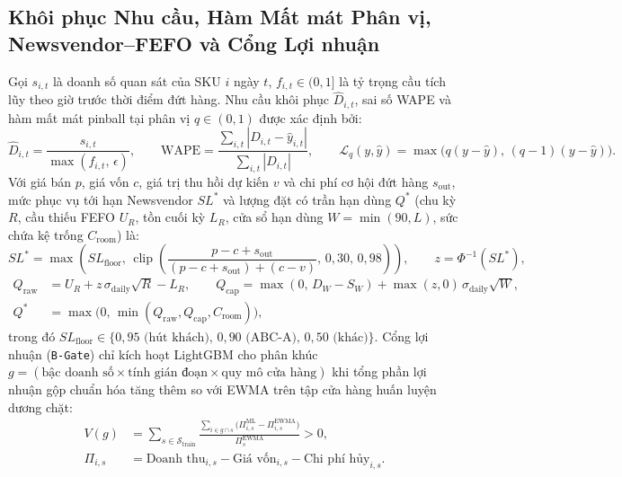 \subsection*{Khôi phục Nhu cầu, Hàm Mất mát Phân vị, Newsvendor--FEFO và Cổng Lợi nhuận}
Gọi $s_{i,t}$ là doanh số quan sát của SKU $i$ ngày $t$, $f_{i,t} \in (0,1]$ là tỷ trọng cầu tích lũy theo giờ trước thời điểm đứt hàng. Nhu cầu khôi phục $\hat{D}_{i,t}$, sai số WAPE và hàm mất mát pinball tại phân vị $q \in (0,1)$ được xác định bởi:
\begin{equation}
    \hat{D}_{i,t} = \frac{s_{i,t}}{\max(f_{i,t},\,\epsilon)}, \qquad
    \text{WAPE} = \frac{\sum_{i,t} \left|D_{i,t} - \hat{y}_{i,t}\right|}{\sum_{i,t} \left|D_{i,t}\right|}, \qquad
    \mathcal{L}_q(y, \hat{y}) = \max\bigl(q(y-\hat{y}),\,(q-1)(y-\hat{y})\bigr).
    \label{eq:wape_recovery}
\end{equation}
Với giá bán $p$, giá vốn $c$, giá trị thu hồi dự kiến $v$ và chi phí cơ hội đứt hàng $s_{\text{out}}$, mức phục vụ tới hạn Newsvendor $SL^*$ và lượng đặt có trần hạn dùng $Q^*$ (chu kỳ $R$, cầu thiếu FEFO $U_R$, tồn cuối kỳ $L_R$, cửa sổ hạn dùng $W = \min(90, L)$, sức chứa kệ trống $C_{\text{room}}$) là:
\begin{equation}
    SL^* = \max\!\left(SL_{\text{floor}},\, \operatorname{clip}\!\left(\frac{p - c + s_{\text{out}}}{(p - c + s_{\text{out}}) + (c - v)},\,0{,}30,\,0{,}98\right)\right), \qquad z = \Phi^{-1}(SL^*),
    \label{eq:newsvendor}
\end{equation}
\begin{equation}
\begin{aligned}
    Q_{\text{raw}} &= U_R + z\,\sigma_{\text{daily}}\sqrt{R} - L_R, \qquad
    Q_{\text{cap}} = \max(0,\, D_W - S_W) + \max(z,0)\,\sigma_{\text{daily}}\sqrt{W}, \\
    Q^* &= \max\!\bigl(0,\,\min(Q_{\text{raw}}, Q_{\text{cap}}, C_{\text{room}})\bigr),
\end{aligned}
    \label{eq:order_qty}
\end{equation}
trong đó $SL_{\text{floor}} \in \{0{,}95\text{ (hút khách)},\,0{,}90\text{ (ABC-A)},\,0{,}50\text{ (khác)}\}$. Cổng lợi nhuận (\texttt{B-Gate}) chỉ kích hoạt LightGBM cho phân khúc $g = (\text{bậc doanh số} \times \text{tính gián đoạn} \times \text{quy mô cửa hàng})$ khi tổng phần lợi nhuận gộp chuẩn hóa tăng thêm so với EWMA trên tập cửa hàng huấn luyện dương chặt:
\begin{equation}
\begin{aligned}
    V(g) &= \sum_{s \in \mathcal{S}_{\text{train}}} \frac{\sum_{i \in g \cap s}\bigl(\Pi^{\text{ML}}_{i,s} - \Pi^{\text{EWMA}}_{i,s}\bigr)}{\Pi^{\text{EWMA}}_s} > 0, \\
    \Pi_{i,s} &= \text{Doanh thu}_{i,s} - \text{Giá vốn}_{i,s} - \text{Chi phí hủy}_{i,s}.
\end{aligned}
    \label{eq:profit_gate}
\end{equation}
